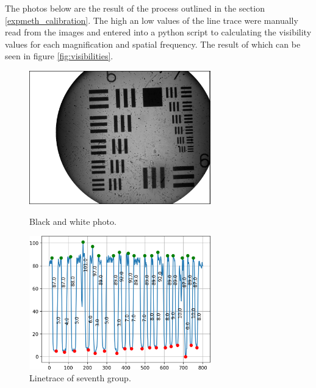 The photos below are the result of the process outlined in the section \ref{expmeth_calibration}. The high an low values of the line trace were manually read from the images and entered into a python script to calculating the visibility values for each magnification and spatial frequency. The result of which can be seen in figure \ref{fig:visibilities}.\\

\begin{figure}[h!]
    \centering
    \begin{minipage}{0.45\textwidth}
      \centering
      \includegraphics[width=0.7\textwidth,keepaspectratio]{afbeeldingen/process_visibility/m3_bw.jpg}
      \caption{Black and white photo.}
      \label{fig:resolution_target}
    \end{minipage}%
    \begin{minipage}{.45\textwidth}
      \centering
      \includegraphics[width=0.7\textwidth,keepaspectratio]{afbeeldingen/process_visibility/m3_rpg_7.png}
      \caption{Linetrace of seventh group.}
      \label{fig:linetrace}
    \end{minipage}
\end{figure}

